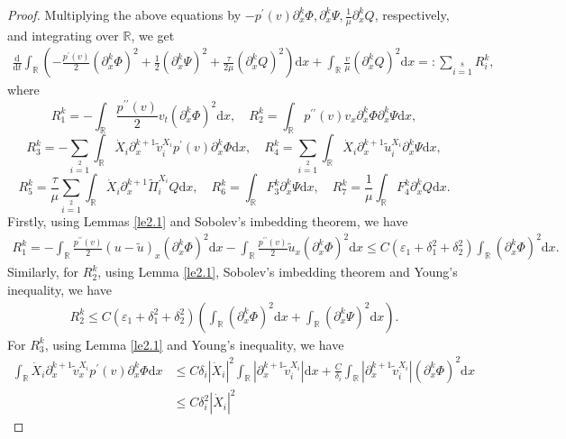 \documentclass[10pt,a4paper]{amsart}
\newcommand{\dif}{\mathrm{d}}
\begin{document}
\begin{proof}
Multiplying the above equations by $-p^{\prime}(v)\partial_{x}^k\Phi,\partial_{x}^k\Psi,\frac{1}{\mu}\partial_{x}^kQ$, respectively, and integrating over $\mathbb{R}$, we get
\begin{align}\label{4.11}
  \frac{\dif}{\dif t}\int_\mathbb{R}\left(-\frac{p^{\prime}(v)}{2}(\partial_{x}^k\Phi)^2
  +\frac{1}{2}(\partial_{x}^k\Psi)^2
  +\frac{\tau}{2\mu}(\partial_{x}^kQ)^2\right)\dif x
   +\int_\mathbb{R}\frac{v}{\mu}(\partial_x^kQ)^2\dif x
    =:\sum\limits_{i=1}\limits^{8}R^k_i,
\end{align}
where
\[
R^k_1=-\int_\mathbb{R}\frac{p^{\prime\prime}(v)}{2}v_t(\partial_{x}^k\Phi)^2\dif x, \quad
R^k_2=\int_\mathbb{R}p^{\prime\prime}(v)v_{x}\partial_{x}^k\Phi\partial_{x}^k\Psi \dif x,
\]
\[
R^k_3=-\sum\limits_{i=1}\limits^2
\int_\mathbb{R}\dot{X}_i\partial_{x}^{k+1}\widetilde{v}^{X_i}_ip^{\prime}(v)\partial_{x}^k\Phi \dif x,
\quad
R^k_4=\sum\limits_{i=1}\limits^2
\int_\mathbb{R}\dot{X}_i\partial_{x}^{k+1}\widetilde{u}^{X_i}_i\partial_{x}^k\Psi \dif x,
\]
\[
R^k_5=\frac{\tau}{\mu}\sum\limits_{i=1}\limits^2
\int_\mathbb{R}\dot{X}_i\partial_{x}^{k+1}\widetilde{\Pi}^{X_i}_iQ\dif x,\quad
R^k_6=\int_\mathbb{R}F_3^k\partial_{x}^k\Psi \dif x,\quad
R^k_7=\frac{1}{\mu}\int_\mathbb{R}F_4^k\partial_{x}^kQ\dif x.
\]
Firstly, using Lemmas \ref{le2.1} and Sobolev's imbedding theorem, we have
\begin{align*}
R^k_1=-\int_\mathbb{R}\frac{p^{\prime\prime}(v)}{2}(u-\widetilde{u})_x(\partial_{x}^k\Phi)^2\dif x
-\int_\mathbb{R}\frac{p^{\prime\prime}(v)}{2}\widetilde{u}_x(\partial_{x}^k\Phi)^2\dif x
\le C(\varepsilon_1+\delta_1^2+\delta_2^2)\int_\mathbb{R}(\partial_{x}^k\Phi)^2\dif x.
\end{align*}
Similarly, for $R^k_2$, using Lemma \ref{le2.1}, Sobolev's imbedding theorem and Young's inequality, we have
\begin{align*}
R^k_2\le C(\varepsilon_1+\delta_1^2+\delta_2^2)\left(\int_\mathbb{R}(\partial_{x}^k\Phi)^2\dif x
+\int_\mathbb{R}(\partial_{x}^k\Psi)^2\dif x\right).
\end{align*}
For $R^k_3$, using Lemma \ref{le2.1} and Young's inequality, we have
\begin{align*}
\int_\mathbb{R}\dot{X}_i\partial_{x}^{k+1}\widetilde{v}^{X_i}_xp^{\prime}(v)\partial_{x}^k\Phi \dif x
&\le C\delta_i|\dot{X}_i|^2\int_\mathbb{R}|\partial_{x}^{k+1}\widetilde{v}^{X_i}_i|\dif x
+\frac{C}{\delta_i}\int_\mathbb{R}|\partial_{x}^{k+1}\widetilde{v}^{X_i}_i|(\partial_{x}^k\Phi)^2 \dif x\\
&\le C\delta_i^2|\dot{X}_i|^2

\end{align*}
\end{proof}
\end{document}
